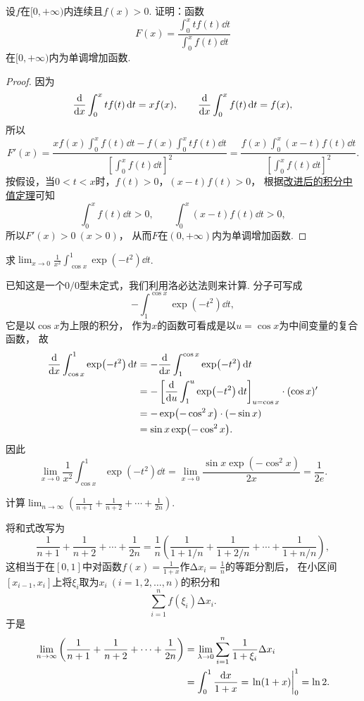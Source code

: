 \begin{example}
\def\fu{\displaystyle \int_0^x t f(t) \dd{t}}
\def\fv{\displaystyle \int_0^x f(t) \dd{t}}
\def\fvv{\left[ \fv \right]^2}
\def\fw{\displaystyle \int_0^x (x-t) f(t) \dd{t}}
设\(f\)在\([0,+\infty)\)内连续且\(f(x) > 0\).
证明：函数\[
	F(x) = \frac{\fu}{\fv}
\]在\([0,+\infty)\)内为单调增加函数.
\begin{proof}
因为\[
	\dv{x} \fu = x f(x),
	\qquad
	\dv{x} \fv = f(x),
\]
所以\[
	F'(x) = \frac{x f(x) \fv - f(x) \fu}{\fvv}
	= \frac{f(x) \fw}{\fvv}.
\]
按假设，当\(0 < t < x\)时，\(f(t) > 0\)，\((x-t) f(t) > 0\)，
根据\hyperref[theorem:定积分.积分中值定理1推论2改进]{改进后的积分中值定理}可知\[
	\fv > 0, \qquad \fw > 0,
\]
所以\(F'(x) > 0\ (x > 0)\)，
从而\(F\)在\((0,+\infty)\)内为单调增加函数.
\end{proof}
\end{example}

\begin{example}
求\(\lim_{x\to0} \frac1{x^2} \int_{\cos x}^1 \exp(-t^2) \dd{t}\).
\begin{solution}
已知这是一个\(0/0\)型未定式，我们利用洛必达法则来计算.
分子可写成\[
	- \int_1^{\cos x} \exp(-t^2) \dd{t},
\]
它是以\(\cos x\)为上限的积分，
作为\(x\)的函数可看成是以\(u = \cos x\)为中间变量的复合函数，
故\begin{align*}
	\dv{x} \int_{\cos x}^1 \exp(-t^2) \dd{t}
	&= -\dv{x} \int_1^{\cos x} \exp(-t^2) \dd{t} \\
	&= -\left[ \dv{u}\int_1^u \exp(-t^2) \dd{t} \right]_{u=\cos x} \cdot (\cos x)' \\
	&= -\exp(-\cos^2 x) \cdot (-\sin x) \\
	&= \sin x \exp(-\cos^2 x).
\end{align*}
因此\[
	\lim_{x\to0} \frac1{x^2} \int_{\cos x}^1 \exp(-t^2) \dd{t}
	= \lim_{x\to0} \frac{\sin x \exp(-\cos^2 x)}{2x}
	= \frac1{2e}.
\]
\end{solution}
\end{example}

\begin{example}
计算\(\lim_{n\to\infty} \left(\frac1{n+1}+\frac1{n+2}+\dotsb+\frac1{2n}\right)\).
\begin{solution}
将和式改写为\[
	\frac1{n+1}+\frac1{n+2}+\dotsb+\frac1{2n}
	= \frac1n \left(\frac1{1+1/n}+\frac1{1+2/n}+\dotsb+\frac1{1+n/n}\right),
\]
这相当于在\([0,1]\)中对函数\(f(x) = \frac1{1+x}\)作\(\increment x_i = \frac1n\)的等距分割后，
在小区间\([x_{i-1},x_i]\)上将\(\xi_i\)取为\(x_i\ (i=1,2,\dotsc,n)\)的积分和\[
	\sum_{i=1}^n f(\xi_i) \increment x_i.
\]
于是\begin{align*}
	\lim_{n\to\infty} \left(\frac1{n+1}+\frac1{n+2}+\dotsb+\frac1{2n}\right)
	&= \lim_{\lambda\to0} \sum_{i=1}^n \frac1{1+\xi_i} \increment x_i \\
	&= \int_0^1 \frac{\dd{x}}{1+x}
	= \eval{\ln(1+x)}_0^1
	= \ln2.
\end{align*}
\end{solution}
\end{example}

